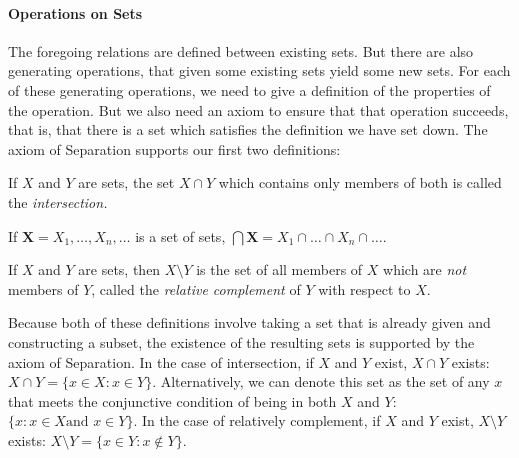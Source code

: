 \paragraph{Operations on Sets} The foregoing relations are defined between existing sets. But there are also generating operations, that given some existing sets yield some new sets. For each of these generating operations, we need to give a definition of the properties of the operation. But we also need an axiom to ensure that that operation succeeds, that is, that there is a set which satisfies the definition we have set down. The axiom of Separation supports our first two definitions: 
\begin{definition}[Intersection] If $X$ and $Y$ are sets, the set $X
    \cap Y$ which contains only members of both is called the {\em
    intersection.} 

If $\mathbf{X}=X_{1},\ldots,X_{n},\ldots$ is a set of sets, $\bigcap \mathbf{X} = X_{1} \cap \ldots \cap X_{n} \cap \ldots$.
\end{definition}
 \begin{definition} If $X$ and $Y$
	are sets, then $X \setminus Y$ is the set of all members of $X$ which
	are \emph{not} members of $Y$, called the \emph{relative complement} of
	$Y$ with respect to $X$. \end{definition}
Because both of these definitions involve taking a set that is already given and constructing a subset, the existence of the resulting sets is supported by the axiom of Separation. In the case of intersection, if $X$ and $Y$ exist, $X \cap Y$ exists: $X\cap Y = \{x \in X:x\in Y\}$. Alternatively, we can denote this set as the set of any $x$ that meets the conjunctive condition of being in both $X$ and $Y$: $\{x: x\in X \text{and } x \in Y\}$. In the case of relatively complement, if $X$ and $Y$ exist, $X\setminus Y$ exists: $X \setminus Y = \{x \in Y: x\notin Y\}$.

